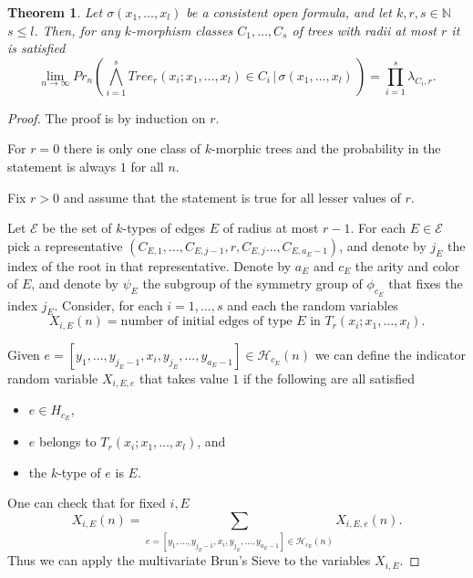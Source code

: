 \documentclass[11pt,notitlepage]{report}
\newtheorem{theorem}{Theorem}[chapter]
\theoremstyle{definition}
\theoremstyle{remark}
\newcommand{\N}{\mathbb{N}}
\newcommand{\Ln}{\lim\limits_{n\to \infty}}
\begin{document}
\begin{theorem} 
	Let $\sigma(x_1,\dots, x_l)$ be a consistent open formula, and let $k,r,s\in \N$ $s\leq l$. Then, for any $k$-morphism classes $C_1, 
	\dots, C_s$ of trees with radii
	at most $r$ it is satisfied
	\[ \Ln Pr_n(\bigwedge_{i=1}^s Tree_r(x_i; x_1, \dots, x_l)\in C_i \, | 
	\, \sigma(x_1,\dots, x_l) \,)= \prod_ {i=1}^s \lambda_{C_i,r}.\]	
\end{theorem}
\begin{proof}
The proof is by induction on $r$. 

	\item For $r=0$ there is only one class
	of $k$-morphic trees and the probability in 
	the statement is always $1$ for all $n$.
	\item Fix $r>0$ and assume that the statement
	is true for all lesser values of $r$. \par
	Let $\mathcal{E}$ be the set of $k$-types of edges $E$ of
	radius at most $r-1$. For each $E\in \mathcal{E}$
	pick a representative
	$( C_{E,1}, \dots, C_{E,j-1}, r, C_{E,j}\dots, C_{E,a_E-1})$, 
	and denote by $j_E$ the index of the root in that representative. 
	Denote by $a_E$ and $c_E$ the arity and color of $E$, and 
	denote by $\psi_E$ the subgroup of the symmetry group of $\phi_{c_E}$ 
	that fixes the index $j_E$.
	Consider, for each $i=1,\dots, s$ and each the random variables 
	\[X_{i,E}(n)= \text{number of initial edges of type }E \text{ in } 
	T_r(x_i;x_1, \dots, x_l). \]
	
	Given $e=[y_1,\dots,y_{j_E-1},x_i, y_{j_E},\dots ,y_{a_E-1}]\in \mathcal{H}_{c_E}(n)$ we can define the indicator 
	random variable $X_{i,E,e}$ that takes value $1$ if the following are 
	all satisfied
	\begin{itemize}
		\item $e\in H_{c_E}$,
		\item $e$ belongs to $T_r(x_i;x_1, \dots, x_l)$, and
		\item the $k$-type of $e$ is $E$. 	
	\end{itemize} 
	One can check that for fixed $i, E$
	\[X_{i,E}(n)= \sum_{e=[y_1,\dots,y_{j_E-1},x_i,y_{j_E},
	\dots ,y_{a_E-1}]\in \mathcal{H}_{c_E}(n)} X_{i,E,e}(n).\]
	Thus we can apply the multivariate Brun's Sieve to the variables 
	$X_{i, E}$.\par
	

\end{proof}
\end{document}
